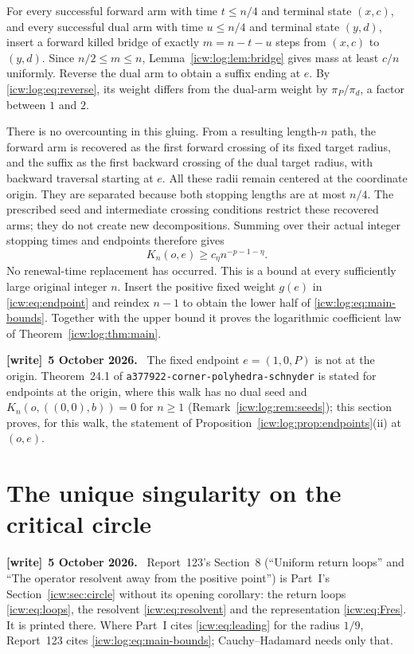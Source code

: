 \documentclass[11pt,letterpaper]{article}
\theoremstyle{remark}\newtheorem{remark}[theorem]{Remark}
\newcommand{\1}{\mathbf1}
\newenvironment{writenote}[1][]{\par\smallskip\begingroup\small
 \noindent\textbf{[write]}\if\relax\detokenize{#1}\relax\else~\textbf{#1.}\fi\ }%
 {\par\endgroup\smallskip}
\newcommand{\file}[1]{\textup{\nolinkurl{#1}}}
\begin{document}
For every successful forward arm with time $t\le n/4$ and terminal
state $(x,c)$, and every successful dual arm with time $u\le n/4$
and terminal state $(y,d)$, insert a forward killed bridge of exactly
$m=n-t-u$ steps from $(x,c)$ to $(y,d)$. Since $n/2\le m\le n$,
Lemma~\ref{icw:log:lem:bridge} gives mass at least $c/n$ uniformly. Reverse the
dual arm to obtain a suffix ending at $e$. By \eqref{icw:log:eq:reverse}, its
weight differs from the dual-arm weight by $\pi_P/\pi_d$, a factor
between $1$ and $2$.

There is no overcounting in this gluing. From a resulting length-$n$
path, the forward arm is recovered as the first forward crossing of its
fixed target radius, and the suffix as the first backward crossing of
the dual target radius, with backward traversal starting at $e$. All
these radii remain centered at the coordinate origin. They are
separated because both stopping lengths are at most $n/4$. The prescribed
seed and intermediate crossing conditions restrict these recovered arms;
they do not create new decompositions. Summing over their actual integer
stopping times and endpoints therefore gives
\begin{equation}\label{icw:log:eq:lower}
 K_n(o,e)\ge c_\eta n^{-p-1-\eta}.
\end{equation}
No renewal-time replacement has occurred. This is a bound at every
sufficiently large original integer $n$. Insert the positive fixed weight
$g(e)$ in \eqref{icw:eq:endpoint} and reindex $n-1$ to obtain the lower half
of \eqref{icw:log:eq:main-bounds}. Together with the upper bound it proves the
logarithmic coefficient law of Theorem~\ref{icw:log:thm:main}.
\begin{writenote}[5 October 2026]
The fixed endpoint $e=(1,0,P)$ is not at the origin. Theorem~24.1 of \file{a377922-corner-polyhedra-schnyder} is stated for endpoints at the origin, where this walk has no dual seed and $K_n(o,((0,0),b))=0$ for $n\ge1$ (Remark~\ref{icw:log:rem:seeds}); this section proves, for this walk, the statement of Proposition~\ref{icw:log:prop:endpoints}(ii) at $(o,e)$.
\end{writenote}

\section{The unique singularity on the critical circle}\label{icw:log:sec:circle}
\begin{writenote}[5 October 2026]
Report~123's Section~8 (``Uniform return loops'' and ``The operator resolvent away from the positive point'') is Part~I's Section~\ref{icw:sec:circle} without its opening corollary: the return loops \eqref{icw:eq:loops}, the resolvent \eqref{icw:eq:resolvent} and the representation \eqref{icw:eq:Fres}. It is printed there. Where Part~I cites \eqref{icw:eq:leading} for the radius $1/9$, Report~123 cites \eqref{icw:log:eq:main-bounds}; Cauchy--Hadamard needs only that.
\end{writenote}
\end{document}
